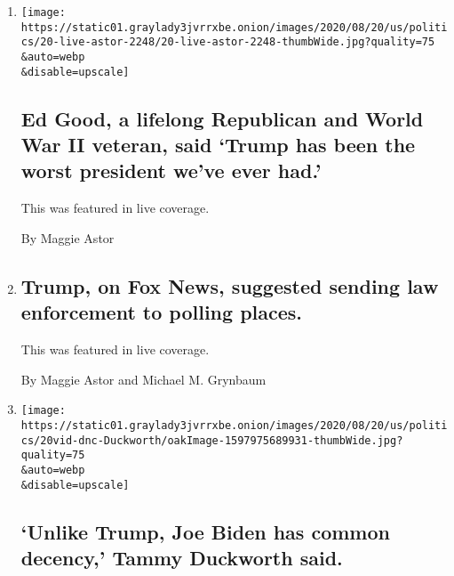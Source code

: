 \begin{enumerate}
\def\labelenumi{\arabic{enumi}.}
\item
  \href{/live/2020/08/20/us/dnc-convention-election/ed-good-a-lifelong-republican-and-world-war-ii-veteran-said-trump-has-been-the-worst-president-weve-ever-had}{}

  \texttt{[image: https://static01.graylady3jvrrxbe.onion/images/2020/08/20/us/politics/20-live-astor-2248/20-live-astor-2248-thumbWide.jpg?quality=75\\\&auto=webp\\\&disable=upscale]}

  \hypertarget{ed-good-a-lifelong-republican-and-world-war-ii-veteran-said-trump-has-been-the-worst-president-weve-ever-had}{%
  \subsection{Ed Good, a lifelong Republican and World War II veteran,
  said `Trump has been the worst president we've ever
  had.'}\label{ed-good-a-lifelong-republican-and-world-war-ii-veteran-said-trump-has-been-the-worst-president-weve-ever-had}}

  This was featured in live coverage.

  By Maggie Astor
\item
  \href{/live/2020/08/20/us/dnc-convention-election/trump-on-fox-news-suggested-sending-law-enforcement-to-polling-places}{}

  \hypertarget{trump-on-fox-news-suggested-sending-law-enforcement-to-polling-places}{%
  \subsection{Trump, on Fox News, suggested sending law enforcement to
  polling
  places.}\label{trump-on-fox-news-suggested-sending-law-enforcement-to-polling-places}}

  This was featured in live coverage.

  By Maggie Astor and Michael M. Grynbaum
\item
  \href{/live/2020/08/20/us/dnc-convention-election/unlike-trump-joe-biden-has-common-decency-tammy-duckworth-said}{}

  \texttt{[image: https://static01.graylady3jvrrxbe.onion/images/2020/08/20/us/politics/20vid-dnc-Duckworth/oakImage-1597975689931-thumbWide.jpg?quality=75\\\&auto=webp\\\&disable=upscale]}

  \hypertarget{unlike-trump-joe-biden-has-common-decency-tammy-duckworth-said}{%
  \subsection{`Unlike Trump, Joe Biden has common decency,' Tammy
  Duckworth
  said.}\label{unlike-trump-joe-biden-has-common-decency-tammy-duckworth-said}}


\end{enumerate}
